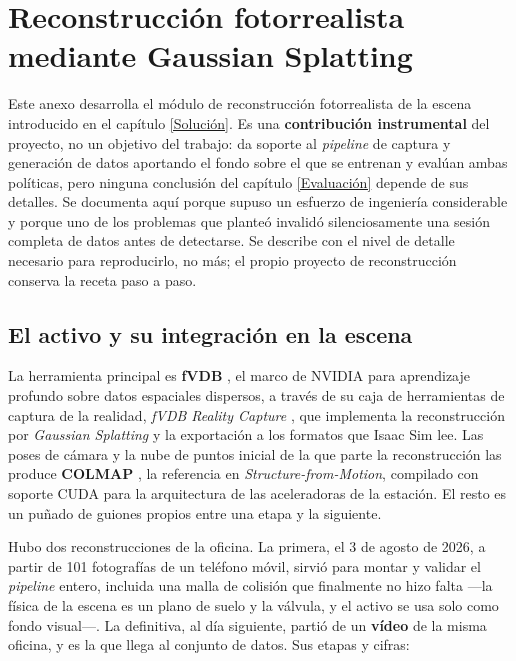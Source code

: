\chapter{Reconstrucción fotorrealista mediante Gaussian Splatting}
\label{Reconstrucción fotorrealista}

Este anexo desarrolla el módulo de reconstrucción fotorrealista de la escena introducido en el
capítulo \ref{Solución}. Es una \textbf{contribución instrumental} del proyecto, no un objetivo del
trabajo: da soporte al \textit{pipeline} de captura y generación de datos aportando el fondo sobre
el que se entrenan y evalúan ambas políticas, pero ninguna conclusión del capítulo
\ref{Evaluación} depende de sus detalles. Se documenta aquí porque supuso un esfuerzo de
ingeniería considerable y porque uno de los problemas que planteó invalidó silenciosamente una
sesión completa de datos antes de detectarse. Se describe con el nivel de detalle necesario para
reproducirlo, no más; el propio proyecto de reconstrucción conserva la receta paso a paso.

\section{El activo y su integración en la escena}

La herramienta principal es \textbf{fVDB} \cite{williams2024fvdb}, el marco de NVIDIA para
aprendizaje profundo sobre datos espaciales dispersos, a través de su caja de herramientas de
captura de la realidad, \textit{fVDB Reality Capture} \cite{fvdb_reality_capture}, que implementa
la reconstrucción por \textit{Gaussian Splatting} \cite{kerbl2023gaussian} y la exportación a los
formatos que Isaac Sim lee. Las poses de cámara y la nube de puntos inicial de la que parte la
reconstrucción las produce \textbf{COLMAP} \cite{schonberger2016sfm}, la referencia en
\textit{Structure-from-Motion}, compilado con soporte CUDA para la arquitectura de las aceleradoras
de la estación. El resto es un puñado de guiones propios entre una etapa y la siguiente.

Hubo dos reconstrucciones de la oficina. La primera, el 3 de agosto de 2026, a partir de 101
fotografías de un teléfono móvil, sirvió para montar y validar el \textit{pipeline} entero,
incluida una malla de colisión que finalmente no hizo falta —la física de la escena es un plano de
suelo y la válvula, y el activo se usa solo como fondo visual—. La definitiva, al día siguiente,
partió de un \textbf{vídeo} de la misma oficina, y es la que llega al conjunto de datos. Sus
etapas y cifras:


